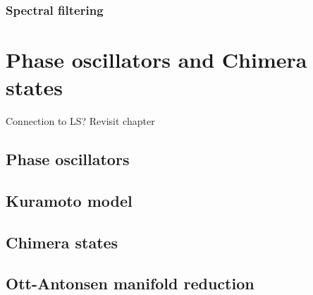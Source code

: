 \subsubsection{Spectral filtering}

\section{Phase oscillators and Chimera states}
Connection to LS?  Revisit chapter
\subsection{Phase oscillators}
\label{sec:phase_oscillators}

\subsection{Kuramoto model}

\subsection{Chimera states}

\subsection{Ott-Antonsen manifold reduction}